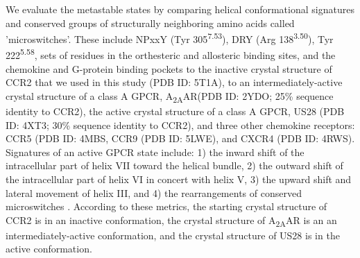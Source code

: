 \documentclass[9pt,twocolumn,twoside]{pnas-new}
\newcommand{\bwn}[2]{#1\textsuperscript{#2}}
\begin{document}
We evaluate the metastable states by comparing helical conformational signatures and conserved groups of structurally neighboring amino acids called 'microswitches'.
These include NPxxY (\bwn{Tyr 305}{7.53}), DRY (\bwn{Arg 138}{3.50}), \bwn{Tyr 222}{5.58}, sets of residues in the orthesteric and allosteric binding sites, and the chemokine and G-protein binding pockets to the inactive crystal structure of CCR2 that we used in this study (PDB ID: 5T1A), to an intermediately-active crystal structure of a class A GPCR, A\textsubscript{2A}AR(PDB ID: 2YDO\cite{Lebon2011}; 25\% sequence identity to CCR2), the active crystal structure of a class A GPCR, US28 (PDB ID: 4XT3\cite{Burg2015}; 30\% sequence identity to CCR2), and three other chemokine receptors: CCR5 (PDB ID: 4MBS\cite{Tan2013}, CCR9 (PDB ID: 5LWE\cite{Oswald2016}), and CXCR4 (PDB ID: 4RWS\cite{Qin2015}).
Signatures of an active GPCR state include:
1) the inward shift of the intracellular part of helix VII toward the helical bundle,
2) the outward shift of the intracellular part of helix VI in concert with helix V,
3) the upward shift and lateral movement of helix III,
and 4) the rearrangements of conserved microswitches \cite{Katritch2013}.
According to these metrics, the starting crystal structure of CCR2 is in an inactive conformation\cite{Zheng2016}, the crystal structure of A\textsubscript{2A}AR is an an intermediately-active conformation, and the crystal structure of US28 is in the active conformation.
\end{document}
